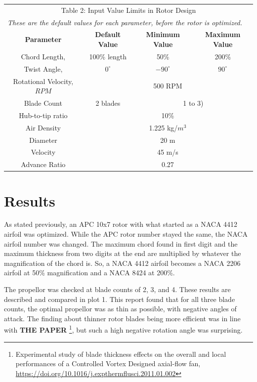 \documentclass[journal ]{new-aiaa}
\begin{document}
\begin{center}
\begin{tabular}{| c | c | c | c |}
	\multicolumn{4}{c}{Table 2: Input Value Limits in Rotor Design} \\
	\multicolumn{4}{l}{\emph{These are the default values for each parameter, before the rotor is optimized.}} \\ \hline
  	 \textbf{Parameter} & \textbf{Default Value} & \textbf{Minimum Value} & \textbf{Maximum Value} \\ \hline
	 Chord Length, & 100\% length & 50\% & 200\% \\ \hline
	 Twist Angle, & $0^{\circ}$ & $-90^{\circ}$ & $90^{\circ}$ \\ \hline \hline
	 Rotational Velocity, $RPM$ & \multicolumn{3}{c|}{500 RPM} \\ \hline
	 Blade Count & 2 blades & \multicolumn{2}{c|}{1 to 3)}\\ \hline
	 Hub-to-tip ratio & \multicolumn{3}{c|}{10\%} \\ \hline
	 Air Density & \multicolumn{3}{c|}{1.225 kg/$m^{3}$} \\ \hline
	 Diameter & \multicolumn{3}{c|}{20 m} \\ \hline
	 Velocity & \multicolumn{3}{c|}{45 m/s} \\ \hline
	 Advance Ratio & \multicolumn{3}{c|}{0.27} \\ \hline
\end{tabular}
\end{center}


\section{Results}

As stated previously, an APC 10x7 rotor with what started as a NACA 4412 airfoil was optimized. While the APC rotor number stayed the same, the NACA airfoil number was changed. The maximum chord found in first digit and the maximum thickness from two digits at the end are multiplied by whatever the magnification of the chord is. So, a NACA 4412 airfoil becomes a NACA 2206 airfoil at 50\% magnification and a NACA 8424 at 200\%.

The propellor was checked at blade counts of 2, 3, and 4. These results are described and compared in plot 1. This report found that for all three blade counts, the optimal propellor was as thin as possible, with negative angles of attack. The finding about thinner rotor blades being more efficient was in line with \textbf{THE PAPER} \footnote{Experimental study of blade thickness effects on the overall and local performances of a Controlled Vortex Designed axial-flow fan, \url{https://doi.org/10.1016/j.expthermflusci.2011.01.002}}, but such a high negative rotation angle was surprising.
\end{document}
